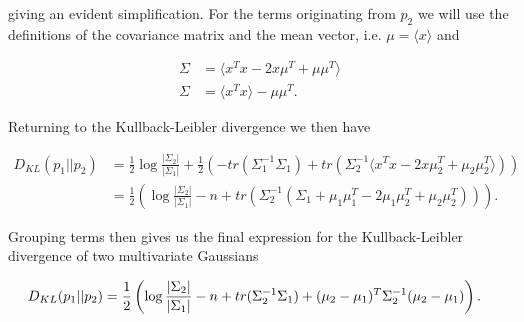 \noindent giving an evident simplification. For the terms originating from $p_2$ we will use the definitions of the covariance matrix and the mean vector, i.e. $\mu = \langle x \rangle$ and 

\begin{align*}
\Sigma &= \langle x^Tx -2x\mu^T + \mu \mu^T\rangle \\
\Sigma &= \langle x^Tx \rangle - \mu \mu^T.
\end{align*} 

\noindent Returning to the Kullback-Leibler divergence we then have 

\begin{align*}
D_{KL}(p_1|| p_2 ) &= \frac{1}{2}\log \frac{|\Sigma_2|}{|\Sigma_1|} + \frac{1}{2} (- tr(\Sigma^{-1}_1 \Sigma_1) + tr(\Sigma^{-1}_2\langle x^Tx -2x\mu_2^T + \mu_2 \mu_2^T \rangle)) \\
&= \frac{1}{2} \left( \log \frac{|\Sigma_2|}{|\Sigma_1|} -n + tr(\Sigma^{-1}_2 (\Sigma_1 + \mu_1\mu_1^T - 2\mu_1\mu_2^T + \mu_2 \mu_2^T ))\right). 
\end{align*}

\noindent Grouping terms then gives us the final expression for the Kullback-Leibler divergence of two multivariate Gaussians

\begin{equation}\label{eq:kl_gauss}
\hspace*{-0.1in}
D_{KL}(p_1|| p_2 ) = \frac{1}{2} \left( \log \frac{|\Sigma_2|}{|\Sigma_1|} -n + tr(\Sigma^{-1}_2 \Sigma_1) + (\mu_2 - \mu_1)^T\Sigma_2^{-1}(\mu_2 - \mu_1) \right).
\end{equation}
